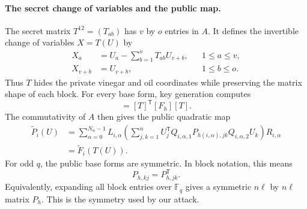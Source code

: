 \documentclass[11pt]{article}
\newcommand{\F}{\mathbb F}
\newcommand{\transpose}{\mathsf T}
\begin{document}
\paragraph{The secret change of variables and the public map.}
The secret matrix $T^{12}=(T_{ab})$ has $v$ by $o$ entries in $A$.  It defines
the invertible change of variables $X=T(U)$ by
\begin{equation}
 \begin{aligned}
  X_a&=U_a-\sum_{b=1}^o T_{ab}U_{v+b}, &&1\le a\le v,\\
  X_{v+b}&=U_{v+b}, &&1\le b\le o.
 \end{aligned}
 \label{eq:scheme-secret-change}
\end{equation}
Thus $T$ hides the private vinegar and oil coordinates while preserving the
matrix shape of each block.  For every base form, key generation computes
\begin{equation}
 [P_h]=[T]^\transpose[F_h][T].
 \label{eq:scheme-base-public}
\end{equation}
The commutativity of $A$ then gives the public quadratic map
\begin{equation}
 \begin{split}
 \widetilde P_i(U)
 &=\sum_{\alpha=0}^{N_\alpha-1} L_{i,\alpha}
 \left(
   \sum_{j,k=1}^n
   U_j^\transpose
   Q_{i,\alpha,1}P_{h(i,\alpha),jk}Q_{i,\alpha,2}U_k
 \right)R_{i,\alpha}\\
 &=\widetilde F_i(T(U)).
 \end{split}
 \label{eq:scheme-public-map}
\end{equation}
For odd $q$, the public base forms are symmetric.  In block notation, this
means
\begin{equation}
 P_{h,kj}=P_{h,jk}^\transpose.
 \label{eq:scheme-public-symmetry}
\end{equation}
Equivalently, expanding all block entries over $\F_q$ gives a symmetric
$n\ell$ by $n\ell$ matrix $P_h$.  This is the symmetry used by our attack.
\end{document}
